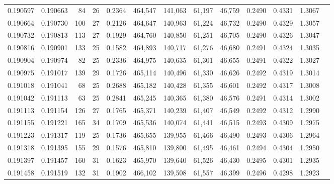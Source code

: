\begin{tabular}{rrrrrrrrrrrrr}
0.190597 & 0.190663 &  84 &  26 &                                     0.2364 & 464,547 & 141,063 &  61,197 &  46,759 & 0.2490 & 0.4331 & 1.3067 \\
0.190664 & 0.190730 & 100 &  27 &                                     0.2126 & 464,647 & 140,963 &  61,224 &  46,732 & 0.2490 & 0.4329 & 1.3057 \\
0.190732 & 0.190813 & 113 &  27 &                                     0.1929 & 464,760 & 140,850 &  61,251 &  46,705 & 0.2490 & 0.4326 & 1.3047 \\
0.190816 & 0.190901 & 133 &  25 &                                     0.1582 & 464,893 & 140,717 &  61,276 &  46,680 & 0.2491 & 0.4324 & 1.3035 \\
0.190904 & 0.190974 &  82 &  25 &                                     0.2336 & 464,975 & 140,635 &  61,301 &  46,655 & 0.2491 & 0.4322 & 1.3027 \\
0.190975 & 0.191017 & 139 &  29 &                                     0.1726 & 465,114 & 140,496 &  61,330 &  46,626 & 0.2492 & 0.4319 & 1.3014 \\
0.191018 & 0.191041 &  68 &  25 &                                     0.2688 & 465,182 & 140,428 &  61,355 &  46,601 & 0.2492 & 0.4317 & 1.3008 \\
0.191042 & 0.191113 &  63 &  25 &                                     0.2841 & 465,245 & 140,365 &  61,380 &  46,576 & 0.2491 & 0.4314 & 1.3002 \\
0.191113 & 0.191154 & 126 &  27 &                                     0.1765 & 465,371 & 140,239 &  61,407 &  46,549 & 0.2492 & 0.4312 & 1.2990 \\
0.191155 & 0.191221 & 165 &  34 &                                     0.1709 & 465,536 & 140,074 &  61,441 &  46,515 & 0.2493 & 0.4309 & 1.2975 \\
0.191223 & 0.191317 & 119 &  25 &                                     0.1736 & 465,655 & 139,955 &  61,466 &  46,490 & 0.2493 & 0.4306 & 1.2964 \\
0.191318 & 0.191395 & 155 &  29 &                                     0.1576 & 465,810 & 139,800 &  61,495 &  46,461 & 0.2494 & 0.4304 & 1.2950 \\
0.191397 & 0.191457 & 160 &  31 &                                     0.1623 & 465,970 & 139,640 &  61,526 &  46,430 & 0.2495 & 0.4301 & 1.2935 \\
0.191458 & 0.191519 & 132 &  31 &                                     0.1902 & 466,102 & 139,508 &  61,557 &  46,399 & 0.2496 & 0.4298 & 1.2923 \\

\end{tabular}
